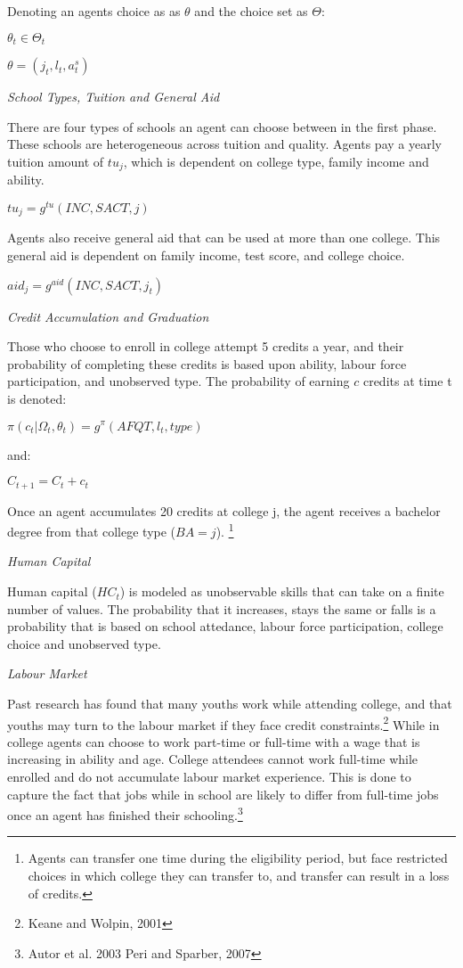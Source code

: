 \documentclass[letterpaper,12pt]{article}
\begin{document}
\noindent Denoting an agents choice as as $\theta$ and the choice set as $\Theta$:

$\theta_t \in \Theta_t$

$\theta = (j_t, l_t, a_t^{s})$

\noindent \emph{School Types, Tuition and General Aid}

There are four types of schools an agent can choose between in the first phase. These schools are heterogeneous across tuition and quality. Agents pay a yearly tuition amount of $tu_j$, which is dependent on college type, family income and ability.

$tu_j = g^{tu}(INC, SACT, j)$

Agents also receive general aid that can be used at more than one college. This general aid is dependent on family income, test score, and college choice.

$aid_j = g^{aid}(INC, SACT, j_t)$

\noindent \emph{Credit Accumulation and Graduation}

Those who choose to enroll in college attempt 5 credits a year, and their probability of completing these credits is based upon ability, labour force participation, and unobserved type. The probability of earning $c$ credits at time t is denoted:

$\pi(c_{t}| \Omega_t, \theta_t) = g^{\pi}(AFQT, l_t, type)$

and:

$C_{t+1} = C_t + c_t$

Once an agent accumulates 20 credits at college j, the agent receives a bachelor degree from that college type ($BA = j$). \footnote{Agents can transfer one time during the eligibility period, but face restricted choices in which college they can transfer to, and transfer can result in a loss of credits.}

\noindent \emph{Human Capital}

Human capital ($HC_t$) is modeled as unobservable skills that can take on a finite number of values. The probability that it increases, stays the same or falls is a probability that is based on school attedance, labour force participation, college choice and unobserved type. 

\noindent \emph{Labour Market}

Past research has found that many youths work while attending college, and that youths may turn to the labour market if they face credit constraints.\footnote{Keane and Wolpin, 2001} While in college agents can choose to work part-time or full-time with a wage that is increasing in ability and age. College attendees cannot work full-time while enrolled and do not accumulate labour market experience. This is done to capture the fact that jobs while in school are likely to differ from full-time jobs once an agent has finished their schooling.\footnote{Autor et al. 2003 Peri and Sparber, 2007} 
\end{document}
